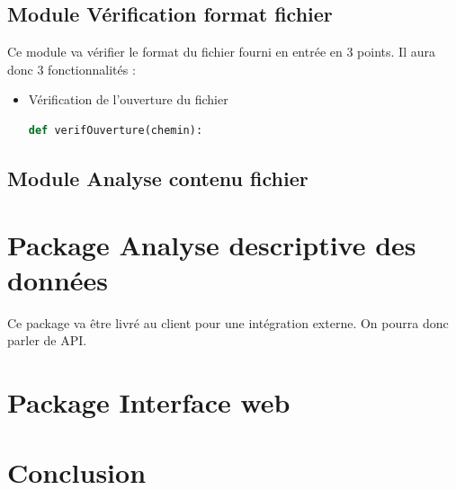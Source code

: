 		\subsection{Module Vérification format fichier}
			Ce module va vérifier le format du fichier fourni en entrée en 3 points. Il aura donc 3 fonctionnalités :
			\begin{itemize}
				\item Vérification de l'ouverture du fichier 
				\begin{lstlisting}[language=Python]
					def verifOuverture(chemin):
				\end{lstlisting}
			\end{itemize}
		
		
		\subsection{Module Analyse contenu fichier}
	
	
	\section{Package Analyse descriptive des données}
	Ce package va être livré au client pour une intégration externe. On pourra donc parler de API.
	
	\section{Package Interface web}
	
	
	\section*{Conclusion}
		
		

